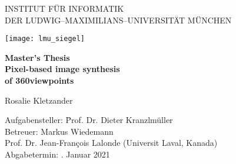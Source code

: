 \begin{center}

\vspace*{-2cm}

{\Huge INSTITUT FÜR INFORMATIK\\[1mm]}
DER LUDWIG--MAXIMILIANS--UNIVERSITÄT MÜNCHEN\\

\vspace*{1cm}

\texttt{[image: lmu\_siegel]}

\vspace*{2cm}

{\Large \textbf{Master's Thesis}}\\ %

\vspace{2.0cm}
{\Huge \textbf{Pixel-based image synthesis}}\\
\vspace*{3mm}
{\Huge \textbf{of 360\degree viewpoints}}\\
\vspace{1.5cm}

{\LARGE Rosalie Kletzander} %
\vspace{2cm}

\parbox{1cm}{
\begin{large}
\begin{tabbing}
Aufgabensteller: \hspace{.5cm} \=Prof. Dr. Dieter Kranzlmüller\\[2mm]
Betreuer:
\>Markus Wiedemann\\ %
\>Prof. Dr. Jean-Fran\c{c}ois Lalonde (Universit Laval, Kanada)\\[5mm]%
Abgabetermin: . Januar 2021\\
\end{tabbing}
\end{large}}\\
\vspace{5mm}

\end{center}
